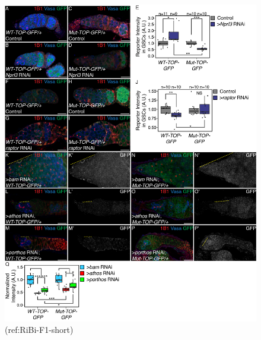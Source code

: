 \documentclass[12pt,oneside]{reedthesis}
\begin{document}
\begin{figure}

{\centering \includegraphics[width=6.5 in,height=8.9375 in]{./figure/Ribosome Biogenesis/Ribosome Biogenesis 6S} 

}

\caption[(ref:RiBi-F1-short)]{(ref:RiBi-F1-short)}\label{fig:unnamed-chunk-17}
\end{figure}
\end{document}
